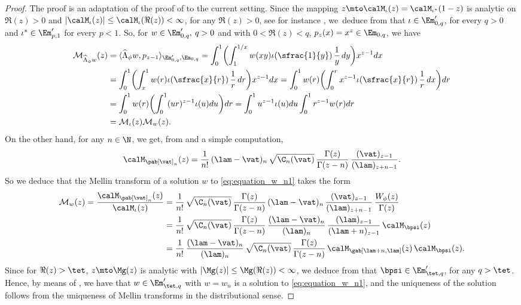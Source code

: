 \begin{proof}
The proof is an adaptation of the proof of \cite[Lem.\,8.5]{Patie-Savov-GeL} to the current setting. Since the mapping $z \mto \calM_{\iota}(z)=\calM_{\iota^*}(1-z)$ is analytic on $\Re(z)>0$ and $|\calM_{\iota}(z)| \leq \calM_{\iota}(\Re(z)) <\infty$, for any $\Re(z)>0$, see for instance \cite[Prop.\,6.8]{Patie-Savov-GeL}, we~deduce from \cite[Th.\,11.10.1]{Misra-Lavoine} that $\iota \in \Em'_{0,q}$, for every $q>0$ and $\iota^* \in \Em'_{p,1}$ for every $p<1$.
So, for $w \in \Em'_{0,q}, \:q>0$ and with $0<\Re(z)<q$, $p_z(x)=x^{z} \in \Em_{0,q}$, we have 	
\begin{align*}
\mathcal{M}_{\widehat{\Lambda}_{\phi} w}(z) &= \langle \widehat{\Lambda}_{\phi} w,p_{z-1}\rangle_{\Em'_{0,q},\Em_{0,q}}
= \int_0^1 \biggl(\int_1^{1/x} w(xy) \iota(\sfrac{1}{y})\,\frac{1}{y}\, dy \biggr) x^{z-1} dx\\
&= \int_0^1 \biggl(\int_x^{1} w(r) \iota(\sfrac{x}{r})\, \frac{1}{r}\, dr \biggr) x^{z-1} dx =
\int_0^1 w(r) \biggl( \int_0^r x^{z-1} \iota(\sfrac{x}{r})\, \frac{1}{r}\, dx \biggr) dr\\
&= \int_0^1 w(r) \biggl(\int_0^1 (ur)^{z-1} \iota(u) du \biggr) dr
= \int_0^1 u^{z-1} \iota(u) du \int_0^1 r^{z-1} w(r) dr\\
& = \mathcal{M}_{\iota}(z) \mathcal{M}_w(z).
\end{align*}
On the other hand, for any $n \in \N$, we get, from \cite[11.7.7]{Misra-Lavoine} and a simple computation,
\begin{align*}
\calM_{\pab[\vat]_n}(z) = \frac{1}{n!}\, (\lam-\vat)_n \,\sqrt{\C_n(\vat)}\, \frac{\Gamma(z)}{\Gamma(z-n)}\, \frac{(\vat)_{z-1}}{(\lam)_{z+n-1}}.
\end{align*}
So we deduce that the Mellin transform of a solution $w$ to \eqref{eq:equation_w_n1} takes the form	
\begin{align*}
\mathcal{M}_{w}(z) = \frac{\calM_{\pab[\vat]_n}(z)}{\calM_{\iota}(z)} &= \frac{1}{n!}\, \sqrt{\C_n(\vat)} \,\frac{\Gamma(z)}{\Gamma(z-n)}\, (\lam-\vat)_n\, \frac{(\vat)_{z-1}}{(\lam)_{z+n-1}}\, \frac{W_\phi(z)}{\Gamma(z)} \\
&= \frac{1}{n!}\, \sqrt{\C_n(\vat)} \,\frac{\Gamma(z)}{\Gamma(z-n)}\, \frac{(\lam-\vat)_n}{(\lam)_n}\, \frac{(\lam)_{z-1}}{(\lam+n)_{z-1}}\, \calM_\bpsi(z) \\
&= \frac{1}{n!}\, \frac{(\lam-\vat)_n}{(\lam)_n}\, \sqrt{\C_n(\vat)} \,\frac{\Gamma(z)}{\Gamma(z-n)}\, \calM_{\gab[\lam+n,\lam]}(z)\, \calM_\bpsi(z).
\end{align*}
Since for $\Re(z)>\tet$, $z\mto \Mg(z)$ is analytic with $|\Mg(z)|\leq \Mg(\Re(z)) <\infty$, we deduce from \cite[Th.\,11.10.1]{Misra-Lavoine} that $\bpsi \in \Em'_{\tet,q}$, for any $q>\tet$. Hence, by means of
\cite[11.7.7]{Misra-Lavoine}, we have that $w \in \Em'_{\tet,q}$ with $w = w_n$ is a solution to \eqref{eq:equation_w_n1}, and the uniqueness of the solution follows from the uniqueness of Mellin transforms in the distributional sense.
\end{proof}

